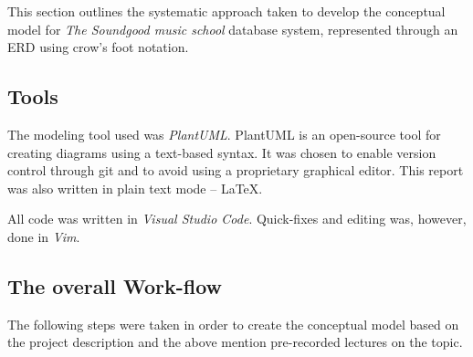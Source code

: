 \documentclass[a4paper]{scrartcl}
\begin{document}



This section outlines the systematic approach taken to develop the conceptual
model for 
\emph{The Soundgood music school} 
database system, represented through an
ERD using crow's foot notation.

\subsection*{Tools}
The modeling tool used was \emph{PlantUML}.
PlantUML is an open-source tool for creating diagrams using a text-based
syntax.
It was chosen to enable version control through git and to avoid using a
proprietary graphical editor.
This report was also written in plain text mode -- \LaTeX.

All code was written in \emph{Visual Studio Code}.
Quick-fixes and editing was, however, done in \emph{Vim}.

\subsection*{The overall Work-flow}
The following steps were taken in order to create the conceptual model based on
the project description 
and the above mention pre-recorded lectures on the topic.
\end{document}

